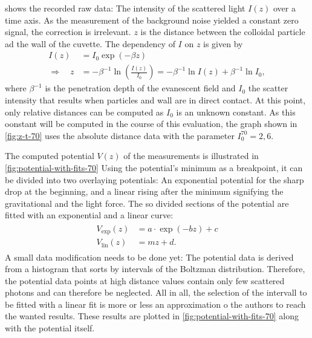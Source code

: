 \documentclass[../bericht.tex]{subfiles}
\begin{document}
       shows the recorded raw data: The intensity of the scattered light $I(z)$ over a time axis. As the measurement of the background noise yielded a constant zero signal, the correction is irrelevant.  $z$ is the distance between the colloidal particle ad the wall of the cuvette. The dependency of $I$ on $z$ is given by
      \begin{align}
        I(z)&=I_0 \exp\left( -\beta z \right)  \\
        \Rightarrow \quad z&=-\beta^{-1} \ln \left(\frac{I(z)}{I_0}\right)=-\beta^{-1}\ln I(z) + \beta^{-1}\ln I_0,
      \end{align}
      where $\beta^{-1}$ is the penetration depth of the evanescent field and $I_0$ the scatter intensity that results when particles and wall are in direct contact. At this point, only relative distances can be computed as $I_0$ is an unknown constant. As this oonstant will be computed in the course of this evaluation, the graph shown in \cref{fig:z-t-70} uses the absolute distance data with the parameter $I_0^{70}=2,6$.
      \medskip

      The computed potential $V(z)$ of the measurements is illustrated in \cref{fig:potential-with-fits-70} Using the potential's minimum as a breakpoint, it can be divided into two overlaying potentials: An exponential potential for the sharp drop at the beginning, and a linear rising after the minimum signifying the gravitational and the light force. The so divided sections of the potential are fitted with an exponential and a linear curve:
      \begin{align}
        \begin{split}
          V_\mathrm{exp}(z) &= a\cdot \exp\left( -b z \right) + c \\
          V_\mathrm{lin}(z) &= mz+ d.
        \end{split}
        \label{eq:pot-fits}
      \end{align}
      A small data modification needs to be done yet: The potential data is derived from a histogram that sorts by intervals of the Boltzman distribution. Therefore, the potential data points at high distance values contain only few scattered photons and can therefore be neglected. All in all, the selection of the intervall to be fitted with a linear fit is more or less an approximation o the authors to reach the wanted results. These results are plotted in \cref{fig:potential-with-fits-70} along with the potential itself.
\end{document}
